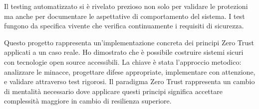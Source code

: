 \documentclass[12pt, a4paper]{article}
\begin{document}
Il testing automatizzato si è rivelato prezioso non solo per validare le protezioni ma anche per documentare le aspettative di comportamento del sistema. I test fungono da specifica vivente che verifica continuamente i requisiti di sicurezza.

Questo progetto rappresenta un'implementazione concreta dei principi Zero Trust applicati a un caso reale. Ho dimostrato che è possibile costruire sistemi sicuri con tecnologie open source accessibili. La chiave è stata l'approccio metodico: analizzare le minacce, progettare difese appropriate, implementare con attenzione, e validare attraverso test rigorosi. Il paradigma Zero Trust rappresenta un cambio di mentalità necessario dove applicare questi principi significa accettare complessità maggiore in cambio di resilienza superiore.
\end{document}
